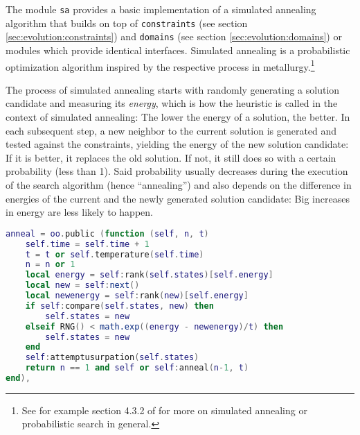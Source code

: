 The module \texttt{sa} provides a basic implementation of a simulated annealing algorithm that builds on top of \texttt{constraints} (see section \ref{sec:evolution:constraints}) and \texttt{domains} (see section \ref{sec:evolution:domains}) or modules which provide identical interfaces. Simulated annealing is a probabilistic optimization algorithm inspired by the respective process in metallurgy.\footnote{See for example section 4.3.2 of \cite{RussellNorvig2003} for more on simulated annealing or probabilistic search in general.}

The process of simulated annealing starts with randomly generating a solution candidate and measuring its \emph{energy}, which is how the heuristic is called in the context of simulated annealing: The lower the energy of a solution, the better. In each subsequent step, a new neighbor to the current solution is generated and tested against the constraints, yielding the energy of the new solution candidate: If it is better, it replaces the old solution. If not, it still does so with a certain probability (less than 1). Said probability usually decreases during the execution of the search algorithm (hence ``annealing'') and also depends on the difference in energies of the current and the newly generated solution candidate: Big increases in energy are less likely to happen.

\begin{lstlisting}[language=lua, caption={Definition of the \texttt{anneal} method of \texttt{sa.process} (inside a template table passed to \texttt{object:intend})}, label=lst:anneal, name=lst:anneal]
anneal = oo.public (function (self, n, t)
	self.time = self.time + 1
	t = t or self.temperature(self.time)
	n = n or 1
	local energy = self:rank(self.states)[self.energy]
	local new = self:next()
	local newenergy = self:rank(new)[self.energy]
	if self:compare(self.states, new) then
		self.states = new
	elseif RNG() < math.exp((energy - newenergy)/t) then
		self.states = new
	end
	self:attemptusurpation(self.states)
	return n == 1 and self or self:anneal(n-1, t)
end),
\end{lstlisting}

